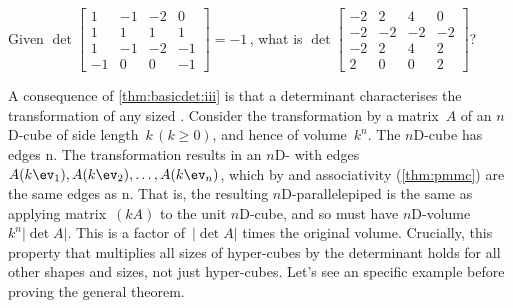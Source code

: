 \begin{activity}\sloppy
Given
\(\det\begin{bmatrix} 1&-1&-2&0
\\1&1&1&1
\\1&-1&-2&-1
\\-1&0&0&-1 \end{bmatrix}=-1\)\,,
what is 
\(\det\begin{bmatrix} -2&2&4&0
\\-2&-2&-2&-2
\\-2&2&4&2
\\2&0&0&2 \end{bmatrix}\)?
\end{activity}


A consequence of \autoref{thm:basicdet:iii} is that a determinant characterises the transformation of any sized . 
Consider the transformation by a matrix~\(A\) of an $n$D-cube of side length~\(k\,(k\geq0)\), and hence of volume~\(k^n\).
The $n$D-cube has edges n.
The transformation results in an $n$D- with edges \(A(k\ev_1),A(k\ev_2),\ldots,A(k\ev_n)\), which by  and associativity (\autoref{thm:pmmc}) are the same edges as n.
That is, the resulting $n$D-parallelepiped is the same as applying matrix~\((kA)\) to the unit $n$D-cube, and so must have $n$D-volume~\(k^n|\det A|\).
This is a factor of~\(|\det A|\) times the original volume.
Crucially, this property that  multiplies all sizes of hyper-cubes by the determinant holds for all other shapes and sizes, not just hyper-cubes.
Let's see an specific example before proving the general theorem.

